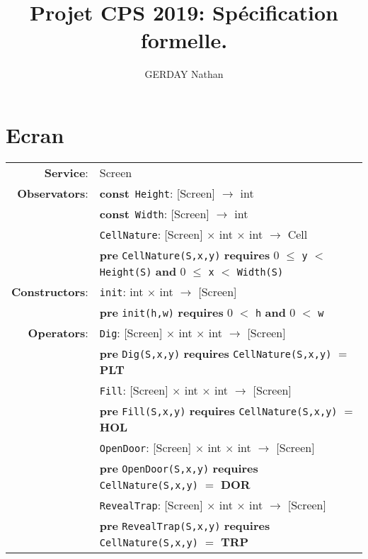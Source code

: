 \documentclass[7pt]{article}
\begin{document}
\title{Projet CPS 2019: Spécification formelle.}

\author{GERDAY Nathan}
\date{}
\maketitle


\section*{Ecran}

\begin{tabular}{rl}
\textbf{Service}: & \textrm{Screen}  \\
\textbf{Observators}: & \textbf{const}~\texttt{Height}: \textrm{[Screen]} $\rightarrow$ \textrm{int} \\
& \textbf{const}~\texttt{Width}: \textrm{[Screen]} $\rightarrow$ \textrm{int} \\
& \texttt{CellNature}: \textrm{[Screen]} $\times$ \textrm{int} $\times$ \textrm{int} $\rightarrow$ \textrm{Cell} \\
& \quad \textbf{pre } \texttt{CellNature(S,x,y)} \textbf{ requires } 0 $\leq$ \texttt{y} $<$ \texttt{Height(S)} \textbf{ and } 0 $\leq$ \texttt{x} $<$ \texttt{Width(S)}\\
\textbf{Constructors}: & \texttt{init}: \textrm{int} $\times$ \textrm{int} $\rightarrow$ \textrm{[Screen]} \\
& \quad \textbf{pre } \texttt{init(h,w)} \textbf{ requires } 0 $<$ \texttt{h} \textbf{ and } 0 $<$ \texttt{w} \\
\textbf{Operators}: & \texttt{Dig}: \textrm{[Screen]} $\times$ \textrm{int} $\times$ \textrm{int}  $\rightarrow$ \textrm{[Screen]} \\
& \quad \textbf{pre } \texttt{Dig(S,x,y)} \textbf{ requires } \texttt{CellNature(S,x,y)} $=$ \textbf{PLT} \\
& \texttt{Fill}: \textrm{[Screen]} $\times$ \textrm{int} $\times$ \textrm{int}  $\rightarrow$ \textrm{[Screen]} \\
& \quad \textbf{pre } \texttt{Fill(S,x,y)} \textbf{ requires } \texttt{CellNature(S,x,y)} $=$ \textbf{HOL} \\
& \texttt{OpenDoor}: \textrm{[Screen]} $\times$ \textrm{int} $\times$ \textrm{int}  $\rightarrow$ \textrm{[Screen]} \\
& \quad \textbf{pre } \texttt{OpenDoor(S,x,y)} \textbf{ requires } \texttt{CellNature(S,x,y)} $=$ \textbf{DOR} \\
& \texttt{RevealTrap}: \textrm{[Screen]} $\times$ \textrm{int} $\times$ \textrm{int}  $\rightarrow$ \textrm{[Screen]} \\
& \quad \textbf{pre } \texttt{RevealTrap(S,x,y)} \textbf{ requires } \texttt{CellNature(S,x,y)} $=$ \textbf{TRP} \\


\end{tabular}
\end{document}
